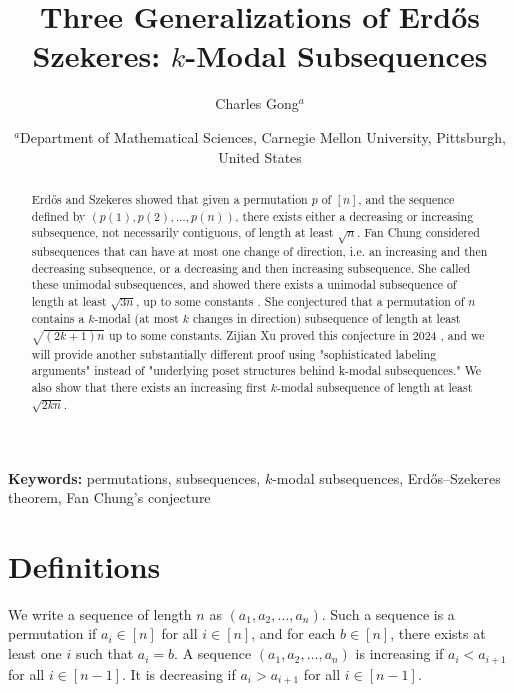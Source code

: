 \documentclass{article}
\title{\textbf{Three Generalizations of Erdős Szekeres: $k$-Modal Subsequences}}
\author{
Charles Gong$^{a}$
}
\date{
$^{a}$Department of Mathematical Sciences, Carnegie Mellon University, Pittsburgh, United States \\
}
\begin{document}
\maketitle

\begin{abstract}
Erdős and Szekeres showed that given a permutation $p$ of $[n]$, and the sequence defined by \newline $(p(1), p(2), \ldots, p(n))$, there exists either a decreasing or increasing subsequence, not necessarily contiguous, of length at least $\sqrt{n}$. Fan Chung considered subsequences that can have at most one change of direction, i.e. an increasing and then decreasing subsequence, or a decreasing and then increasing subsequence. She called these unimodal subsequences, and showed there exists a unimodal subsequence of length at least $\sqrt{3n}$, up to some constants \cite{chung}. She conjectured that a permutation of $n$ contains a $k$-modal (at most $k$ changes in direction) subsequence of length at least $\sqrt{(2k+1)n}$ up to some constants. Zijian Xu proved this conjecture in 2024 \cite{xu}, and we will provide another substantially different proof using "sophisticated labeling arguments" instead of "underlying poset structures behind k-modal subsequences." We also show that there exists an increasing first $k$-modal subsequence of length at least $\sqrt{2kn}$. 
\end{abstract}

\noindent\textbf{Keywords:} permutations, subsequences, $k$-modal subsequences, Erdős–Szekeres theorem, Fan Chung’s conjecture


\maketitle

\section{Definitions}
We write a sequence of length $n$ as $(a_1, a_2, \ldots, a_n)$. Such a sequence is a permutation if $a_i \in [n]$ for all $i \in [n]$, and for each $b \in [n]$, there exists at least one $i$ such that $a_i = b$. A sequence $(a_1, a_2, \ldots, a_n)$ is increasing if $a_i < a_{i+1}$ for all $i \in [n-1]$. It is decreasing if $a_i > a_{i+1}$ for all $i \in [n-1]$. \\
\end{document}
